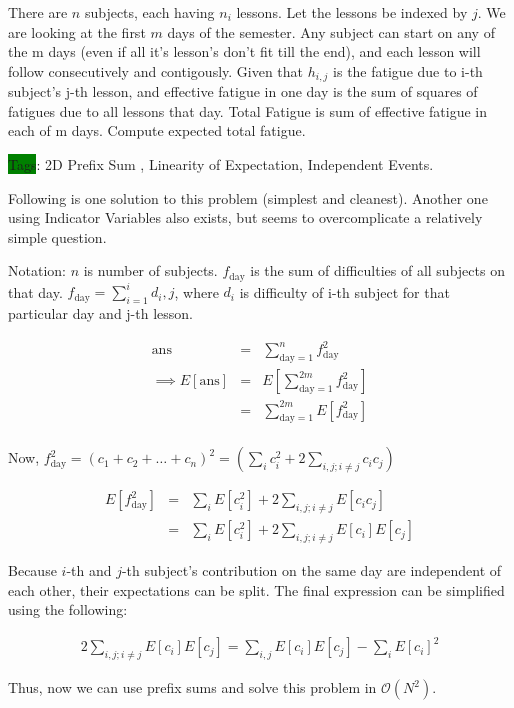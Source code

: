 \begin{problem}{}
    There are $n$ subjects, each having $n_i$ lessons. Let the lessons be indexed by $j$. We are looking at the first $m$ days of the semester. Any subject can start on any of the m days (even if all it's lesson's don't fit till the end), and each lesson will follow consecutively and contigously. Given that $h_{i,j}$ is the fatigue due to i-th subject's j-th lesson, and effective fatigue in one day is the sum of squares of fatigues due to all lessons that day. Total Fatigue is sum of effective fatigue in each of m days. Compute expected total fatigue.
    
    \colorbox{green}{Tags}: 2D Prefix Sum , Linearity of Expectation, Independent Events.
\end{problem}

Following is one solution to this problem (simplest and cleanest). Another one using Indicator Variables also exists, but seems to overcomplicate a relatively simple question.


Notation: $n$ is number of subjects. $f_{\text{day}}$ is the sum of difficulties of all subjects on that day. $f_{\text{day}} = \sum_{i=1}^{i}d_i,j$, where $d_i$ is difficulty of i-th subject for that particular day and j-th lesson. 

\begin{eqnarray*}
    \text{ans} &=& \sum_{\text{day}=1}^{n} f_{\text{day}}^2 \\
    \implies E[\text{ans}] &=&  E\left[\sum_{\text{day}=1}^{2m}f_{\text{day}}^2 \right] \\
    &=& \sum_{\text{day}=1}^{2m}E\left[f_{\text{day}}^2\right]  \\
\end{eqnarray*}

Now, $f_{\text{day}}^2 = (c_1+c_2+\ldots+c_n)^2=(\sum_{i}c_i^2 + 2\sum_{i,j; i\ne j}c_ic_j)$

\begin{eqnarray*}
    E\left[f_{\text{day}}^2\right]&=&\sum_{i}E[c_i^2] + 2\sum_{i,j; i\ne j}E[c_ic_j] \\
    &=& \sum_{i}E[c_i^2] + 2\sum_{i,j; i\ne j}E[c_i]E[c_j] 
\end{eqnarray*}

Because $i$-th and $j$-th subject's contribution on the same day are independent of each other, their expectations can be split. The final expression can be simplified using the following:

\begin{eqnarray*}
    2\sum_{i,j; i\ne j}E[c_i]E[c_j] = \sum_{i,j}E[c_i]E[c_j] - \sum_{i}E[c_i]^2
\end{eqnarray*}

Thus, now we can use prefix sums and solve this problem in $\mathcal{O}(N^2)$.
